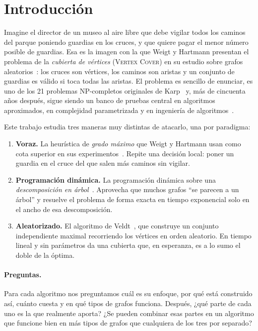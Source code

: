 \section{Introducción}\label{sec:intro}

Imagine el director de un museo al aire libre que debe vigilar todos los caminos del parque poniendo guardias en los cruces, y que quiere pagar el menor número posible de guardias. Esa es la imagen con la que Weigt y Hartmann presentan el problema de la \emph{cubierta de vértices} (\textsc{Vertex Cover}) en su estudio sobre grafos aleatorios~\citep{weigt2000}: los cruces son vértices, los caminos son aristas y un conjunto de guardias es válido si toca todas las aristas. El problema es sencillo de enunciar, es uno de los 21 problemas NP-completos originales de Karp~\citep{karp1972} y, más de cincuenta años después, sigue siendo un banco de pruebas central en algoritmos aproximados, en complejidad parametrizada y en ingeniería de algoritmos~\citep{cygan2015,dzulfikar2019}.

Este trabajo estudia tres maneras muy distintas de atacarlo, una por paradigma:
\begin{enumerate}
  \item \textbf{Voraz.} La heurística de \emph{grado máximo} que Weigt y Hartmann usan como cota superior en sus experimentos~\citep{weigt2001}. Repite una decisión local: poner un guardia en el cruce del que salen más caminos sin vigilar.
  \item \textbf{Programación dinámica.} La programación dinámica sobre una \emph{descomposición en árbol}~\citep{bannach2019,alber2005}. Aprovecha que muchos grafos ``se parecen a un árbol'' y resuelve el problema de forma exacta en tiempo exponencial solo en el ancho de esa descomposición.
  \item \textbf{Aleatorizado.} El algoritmo de Veldt~\citep{veldt2024}, que construye un conjunto independiente maximal recorriendo los vértices en orden aleatorio. En tiempo lineal y sin parámetros da una cubierta que, en esperanza, es a lo sumo el doble de la óptima.
\end{enumerate}

\paragraph{Preguntas.} Para cada algoritmo nos preguntamos cuál es su enfoque, por qué está construido así, cuánto cuesta y en qué tipos de grafos funciona. Después, ¿qué parte de cada uno es la que realmente aporta? ¿Se pueden combinar esas partes en un algoritmo que funcione bien en más tipos de grafos que cualquiera de los tres por separado?

